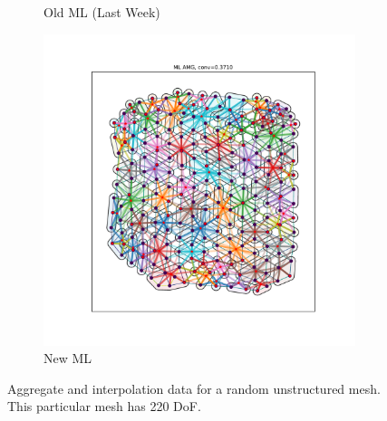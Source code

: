 \documentclass{article}
\begin{document}
\begin{figure}[h]
\begin{subfigure}[t]{0.32\textwidth}
    \caption{Old ML (Last Week)}
  \end{subfigure}
  \begin{subfigure}[t]{0.32\textwidth}
    \centering
    \includegraphics[width=\textwidth, trim=80 70 70 50, clip]{grid_700_new.pdf}
    \caption{New ML}
  \end{subfigure}
  \caption{Aggregate and interpolation data for a random unstructured mesh.  This particular mesh has 220 DoF.}
  \label{fig:grid700}
\end{figure}
\end{document}
